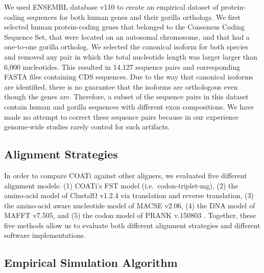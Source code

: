 \documentclass[12pt,letterpaper]{article}
\begin{document}
We used ENSEMBL database v110 \citep{ensembl_hubbard_2002} to create an empirical dataset of protein-coding sequences for both human genes and their gorilla orthologs. We first selected human protein-coding genes that belonged to the Consensus Coding Sequence Set, that were located on an autosomal chromosome, and that had a one-to-one gorilla ortholog. We selected the canonical isoform for both species and removed any pair in which the total nucleotide length was larger larger than 6,000 nucleotides. This resulted in 14,127 sequence pairs and corresponding FASTA files containing CDS sequences. Due to the way that canonical isoforms are identified, there is no guarantee that the isoforms are orthologous even though the genes are. Therefore, a subset of the sequence pairs in this dataset contain human and gorilla sequences with different exon compositions. We have made no attempt to correct these sequence pairs because in our experience genome-wide studies rarely control for such artifacts.

\subsection*{Alignment Strategies}

In order to compare COATi against other aligners, we evaluated five different alignment models: (1) COATi's FST model (i.e.\ codon-triplet-mg), (2) the amino-acid model of ClustalΩ v1.2.4 via translation and reverse translation, (3) the amino-acid aware nucleotide model of MACSE v2.06, (4) the DNA model of MAFFT v7.505, and (5) the codon model of PRANK v.150803 \citep{clustal_omega_sievers_2011,ranwez_macse_2018,katoh2013mafft,prank_loytynoja_2014}. Together, these five methods allow us to evaluate both different alignment strategies and different software implementations.

\subsection*{Empirical Simulation Algorithm}
\end{document}

